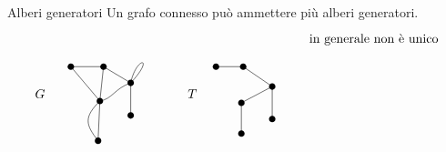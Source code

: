 \documentclass[a4paper]{article}
\begin{document}
\begin{snippetexample}{Alberi generatori}
    Un grafo connesso può ammettere più alberi generatori.
    \[
    \begin{tikzpicture}[
        scale=1,
        line cap=round,
        line join=round,
        v/.style={circle, fill, inner sep=1.8pt}
    ]
        \begin{scope}
            \node at (-0.85,0.25) {\(G\)};

            \coordinate (g1) at (0,1);
            \coordinate (g2) at (0.9,1);
            \coordinate (g3) at (0.8,0.05);
            \coordinate (g4) at (1.65,0.55);
            \coordinate (g5) at (1.65,-0.35);
            \coordinate (g6) at (0.75,-1.05);

            \draw (g1)--(g2);
            \draw (g1)--(g3);
            \draw (g2)--(g3);
            \draw (g2)--(g4);
            \draw (g3) .. controls +(0.35,0.05) and +(-0.45,-0.15) .. (g4);
            \draw (g4)--(g5);

            \draw (g3)--(g6);
            \draw (g3) .. controls +(-0.45,-0.45) and +(-0.35,0.45) .. (g6);

            \draw (g4) .. controls +(0.15,0.75) and +(0.70,0.75) .. (g4);

            \foreach \p in {g1,g2,g3,g4,g5,g6}{
                \node[v] at (\p) {};
            }
        \end{scope}

        \begin{scope}[xshift=4cm]
            \node at (-0.65,0.25) {\(T\)};

            \coordinate (t1) at (0,1);
            \coordinate (t2) at (0.75,1);
            \coordinate (t3) at (0.70,0);
            \coordinate (t4) at (1.55,0.45);
            \coordinate (t5) at (1.55,-0.45);
            \coordinate (t6) at (0.70,-0.85);

            \draw (t1)--(t2)--(t4)--(t5);
            \draw (t4)--(t3)--(t6);

            \foreach \p in {t1,t2,t3,t4,t5,t6}{
                \node[v] at (\p) {};
            }
        \end{scope}

        \begin{scope}[xshift=7.4cm]
            \node at (0.95,1.75) {in generale non è unico};


\end{scope}
\end{tikzpicture}\]
\end{snippetexample}
\end{document}
